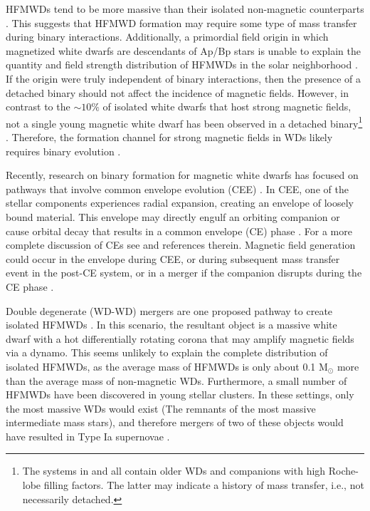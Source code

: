 \documentclass[fleqn,usenatbib]{mnras}
\begin{document}
 HFMWDs tend to be more massive than their isolated non-magnetic counterparts \citep{Liebert_1988}. This suggests that HFMWD formation may require some type of mass transfer during binary interactions. Additionally, a primordial field origin in which magnetized white dwarfs are descendants of Ap/Bp stars is unable to explain the quantity and field strength distribution of HFMWDs in the solar neighborhood \citep{Kawka_2004, kawka_2020}.  If the origin were truly independent of binary interactions, then the presence of a detached binary should not affect the incidence of magnetic fields. However, in contrast to the $\sim$$10\%$ of isolated white dwarfs that host strong magnetic fields, not a single young magnetic white dwarf has been observed in a detached binary\footnote{The systems in \cite{Rebassa_2016} and \cite{Parsons_2021} all contain older WDs and companions with high Roche-lobe filling factors. The latter may indicate a history of mass transfer, i.e., not necessarily detached.} \citep{Kawka_2007,Liebert_2003}. Therefore, the formation channel for strong magnetic fields in WDs likely requires binary evolution \citep{Tout_2008,Nordhaus:2011aa}.

Recently, research on binary formation  for magnetic white dwarfs has focused on pathways that  involve common envelope evolution (CEE) \citep{Tout_2008,Nordhaus:2011aa,FERRARIO20201025}. In CEE,
one of the stellar components experiences radial expansion, creating an envelope of loosely bound material.  This envelope may directly engulf an orbiting companion or cause orbital decay that results in a common envelope (CE) phase \citep{Paczynski1976,Harpaz_1994,Siess_1999,Nordhaus2006,Staff_2016,Belczynski:2016sf,wilson2019,2020MNRAS.497.1895W}. For a more complete discussion of CEs see \cite{Ivanova:2013aa} and references therein. Magnetic field generation could occur in the envelope during CEE, or during subsequent mass transfer event in the post-CE system, or in a merger if the companion disrupts during the CE phase \citep{Tout_2008,Nordhaus:2007aa,Nordhaus:2011aa,Ohlmann_2016}.

Double degenerate (WD-WD) mergers are one proposed pathway to create isolated HFMWDs \citep{Wickramasinghe_2000,Garc_a_Berro_2012}. In this scenario, the resultant object is a massive white dwarf with a hot differentially rotating corona that may amplify magnetic fields via a dynamo.  This seems unlikely to explain the complete distribution of isolated HFMWDs, as the average mass of HFMWDs is only about 0.1 $\mathrm{M_\odot}$ more than the average mass of non-magnetic WDs. Furthermore, a small number of HFMWDs have been discovered in young stellar clusters.  In these settings, only the most massive WDs would exist (The remnants of the most massive intermediate mass stars), and therefore mergers of two of these objects would have resulted in Type Ia supernovae \citep{Caiazzo_2020}.
\end{document}
